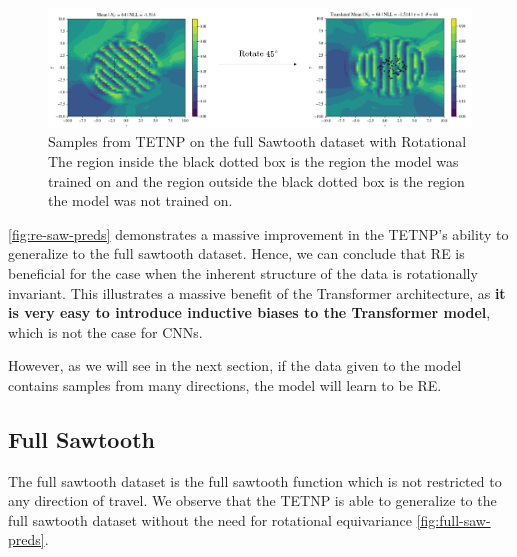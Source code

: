 \documentclass[../../main.tex]{subfiles}
\begin{document}

\begin{figure}[H]
    \centering
    \includegraphics[width=0.9\linewidth]{./fig/res-saw/re.png}
    \caption{Samples from TETNP on the full Sawtooth dataset with Rotational 
    The region inside the black dotted box is the region the model was trained on and the region outside the black dotted box is the region the model was not trained on.}
    \label{fig:re-saw-preds}
\end{figure}

\autoref{fig:re-saw-preds} demonstrates a massive improvement in the TETNP's ability to generalize to the full sawtooth dataset. Hence, we can conclude that RE is beneficial for the case when the inherent structure of the data is rotationally invariant. This illustrates a massive benefit of the Transformer architecture, as \textbf{it is very easy to introduce inductive biases to the Transformer model}, which is not the case for CNNs.

However, as we will see in the next section, if the data given to the model contains samples from many directions, the model will learn to be RE.

\subsection{Full Sawtooth}

The full sawtooth dataset is the full sawtooth function which is not restricted to any direction of travel. We observe that the TETNP is able to generalize to the full sawtooth dataset without the need for rotational equivariance \autoref{fig:full-saw-preds}. 

\end{document}
